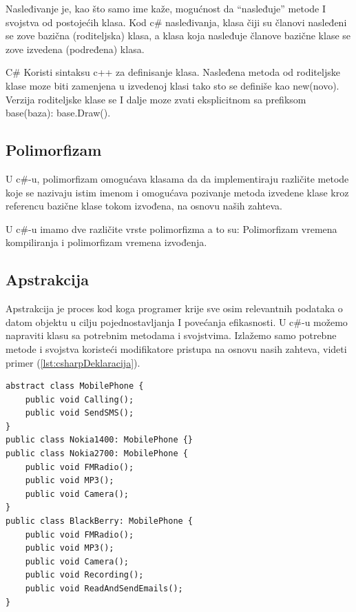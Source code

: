\documentclass[a4paper]{article}
\begin{document}
{Nasleđivanje je, kao što samo ime kaže, mogućnost da “nasleđuje” metode I svojstva od postojećih klasa.
Kod c\# nasleđivanja, klasa čiji su članovi nasleđeni se zove bazična (roditeljska) klasa, a klasa koja nasleđuje članove bazične klase se zove izvedena (podređena) klasa.

C\# Koristi sintaksu c++ za definisanje klasa.
Nasleđena metoda od roditeljske klase moze biti zamenjena u izvedenoj klasi tako sto se definiše kao new(novo).
Verzija roditeljske klase se I dalje moze zvati eksplicitnom sa prefiksom base(baza): base.Draw().

\subsection{Polimorfizam}
\label{subsec:csharpPolimorfizam}

U c\#-u, polimorfizam omogućava klasama da da implementiraju različite metode koje se nazivaju istim imenom i omogućava pozivanje metoda izvedene klase kroz referencu bazične klase tokom izvođena, na osnovu naših zahteva.

U c\#-u imamo dve različite vrste polimorfizma a to su: Polimorfizam vremena kompiliranja i polimorfizam vremena izvođenja.

\subsection{Apstrakcija}
\label{subsec:csharpApstrakcija}

Apstrakcija je proces kod koga programer krije sve osim relevantnih podataka o datom objektu u cilju pojednostavljanja I povećanja efikasnosti.
U c\#-u možemo napraviti klasu sa potrebnim metodama i svojstvima. Izlažemo samo potrebne metode i svojstva koristeći modifikatore pristupa na osnovu nasih zahteva, videti primer (\ref{lst:csharpDeklaracija}).

\begin{lstlisting}[caption={Primer deklarisanja apstraktivne klase u C\#-u},frame=single, label=lst:csharpDeklaracija]
abstract class MobilePhone {  
    public void Calling();  
    public void SendSMS();  
}  
public class Nokia1400: MobilePhone {}  
public class Nokia2700: MobilePhone {  
    public void FMRadio();  
    public void MP3();  
    public void Camera();  
}  
public class BlackBerry: MobilePhone {  
    public void FMRadio();  
    public void MP3();  
    public void Camera();  
    public void Recording();  
    public void ReadAndSendEmails();  
} 
\end{lstlisting}

}
\end{document}
